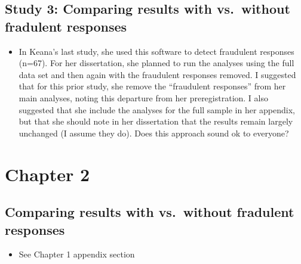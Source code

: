 \documentclass[a4paper, nobind]{templates/ociamthesis}
\providecommand{\tightlist}{%
  \setlength{\itemsep}{0pt}\setlength{\parskip}{0pt}}
\newcommand*{\bibtitle}{Works Cited}
\begin{document}
\hypertarget{study-3-comparing-results-with-vs.-without-fradulent-responses}{%
\subsection{Study 3: Comparing results with vs.~without fradulent responses}\label{study-3-comparing-results-with-vs.-without-fradulent-responses}}

\begin{itemize}
\tightlist
\item
  In Keana's last study, she used this software to detect fraudulent responses (n=67). For her dissertation, she planned to run the analyses using the full data set and then again with the fraudulent responses removed. I suggested that for this prior study, she remove the ``fraudulent responses'' from her main analyses, noting this departure from her preregistration. I also suggested that she include the analyses for the full sample in her appendix, but that she should note in her dissertation that the results remain largely unchanged (I assume they do). Does this approach sound ok to everyone?
\end{itemize}

\hypertarget{chapter-2}{%
\section{Chapter 2}\label{chapter-2}}

\hypertarget{comparing-results-with-vs.-without-fradulent-responses}{%
\subsection{Comparing results with vs.~without fradulent responses}\label{comparing-results-with-vs.-without-fradulent-responses}}

\begin{itemize}
\tightlist
\item
  See Chapter 1 appendix section
\end{itemize}


\setlength{\baselineskip}{0pt} %

{\renewcommand*\MakeUppercase[1]{#1}%
\printbibliography[heading=bibintoc,title={\bibtitle}]}
\end{document}
